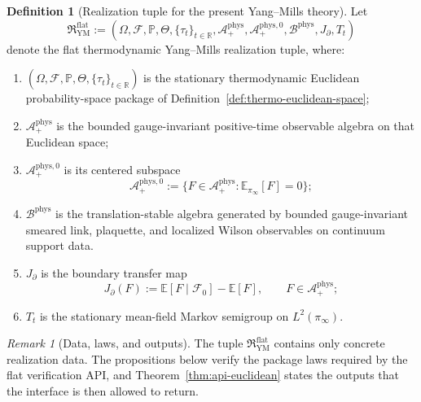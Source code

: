 \documentclass[11pt]{article}
\theoremstyle{definition}
\newtheorem{definition}[theorem]{Definition}
\theoremstyle{remark}
\newtheorem{remark}[theorem]{Remark}
\newcommand{\R}{\mathbb R}
\newcommand{\mcA}{\mathcal A}
\newcommand{\mcB}{\mathcal B}
\begin{document}
\begin{definition}[Realization tuple for the present Yang--Mills theory]
\label{def:api-data}
Let
\[
\mathfrak R_{\mathrm{YM}}^{\mathrm{flat}}
:=
(\Omega,\mathcal F,\mathbb P,\Theta,\{\tau_t\}_{t\in\R},
\mcA^{\mathrm{phys}}_+,\mcA^{\mathrm{phys},0}_+,\mcB^{\mathrm{phys}},
J_{\partial},T_t)
\]
denote the flat thermodynamic Yang--Mills realization tuple, where:
\begin{enumerate}[label=\textnormal{(\roman*)},leftmargin=1.5em]
\item \((\Omega,\mathcal F,\mathbb P,\Theta,\{\tau_t\}_{t\in\R})\) is the
stationary thermodynamic Euclidean probability-space package of
Definition~\ref{def:thermo-euclidean-space};
\item \(\mcA^{\mathrm{phys}}_+\) is the bounded gauge-invariant positive-time
observable algebra on that Euclidean space;
\item \(\mcA^{\mathrm{phys},0}_+\) is its centered subspace
\[
\mcA^{\mathrm{phys},0}_+
:=
\{F\in\mcA^{\mathrm{phys}}_+:\mathbb E_{\pi_\infty}[F]=0\};
\]
\item \(\mcB^{\mathrm{phys}}\) is the translation-stable algebra generated by
bounded gauge-invariant smeared link, plaquette, and localized Wilson
observables on continuum support data.
\item \(J_{\partial}\) is the boundary transfer map
\[
J_{\partial}(F):=\mathbb E[F\mid\mathcal F_0]-\mathbb E[F],
\qquad
F\in\mcA^{\mathrm{phys}}_+;
\]
\item \(T_t\) is the stationary mean-field Markov semigroup on
\(L^2(\pi_\infty)\).
\end{enumerate}
\end{definition}

\begin{remark}[Data, laws, and outputs]
The tuple \(\mathfrak R_{\mathrm{YM}}^{\mathrm{flat}}\) contains only concrete
realization data.  The propositions below verify the package laws required by
the flat verification API, and Theorem~\ref{thm:api-euclidean} states the
outputs that the interface is then allowed to return.
\end{remark}
\end{document}
